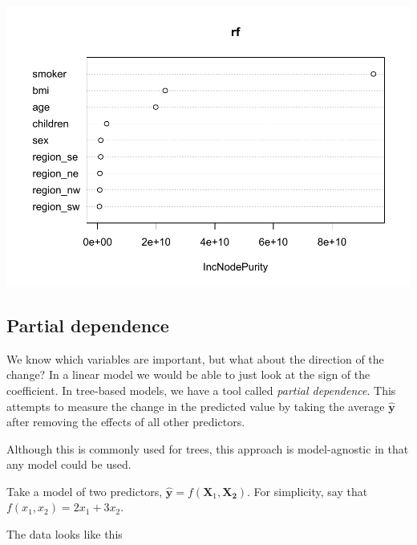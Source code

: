 \documentclass[
  openany]{book}
\newenvironment{Shaded}{\begin{snugshade}}{\end{snugshade}}
\newcommand{\DataTypeTok}[1]{\textcolor[rgb]{0.13,0.29,0.53}{#1}}
\newcommand{\DecValTok}[1]{\textcolor[rgb]{0.00,0.00,0.81}{#1}}
\newcommand{\KeywordTok}[1]{\textcolor[rgb]{0.13,0.29,0.53}{\textbf{#1}}}
\newcommand{\NormalTok}[1]{#1}
\newcommand{\OperatorTok}[1]{\textcolor[rgb]{0.81,0.36,0.00}{\textbf{#1}}}
\newcommand{\StringTok}[1]{\textcolor[rgb]{0.31,0.60,0.02}{#1}}
\begin{document}
\includegraphics{06-tree-based-models_files/figure-latex/unnamed-chunk-16-1.pdf}

\hypertarget{partial-dependence}{%
\subsection{Partial dependence}\label{partial-dependence}}

We know which variables are important, but what about the direction of the change? In a linear model we would be able to just look at the sign of the coefficient. In tree-based models, we have a tool called \emph{partial dependence}. This attempts to measure the change in the predicted value by taking the average \(\hat{\mathbf{y}}\) after removing the effects of all other predictors.

Although this is commonly used for trees, this approach is model-agnostic in that any model could be used.

Take a model of two predictors, \(\hat{\mathbf{y}} = f(\mathbf{X}_1, \mathbf{X_2})\). For simplicity, say that \(f(x_1, x_2) = 2x_1 + 3x_2\).

The data looks like this

\begin{Shaded}
\end{Shaded}
\end{document}
